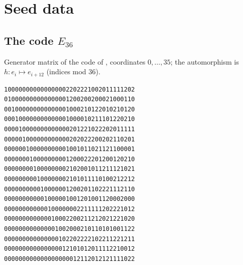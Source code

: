\documentclass[11pt]{amsart}
\theoremstyle{definition}
\begin{document}
\appendix

\section{Seed data}\label{app:seeds}

\subsection{The code \texorpdfstring{$E_{36}$}{E36}}\label{app:gjf}
Generator matrix of the code of \cite[Ex.~5.7(3)]{GJF}, coordinates $0,\dots,35$; the automorphism is
$h\colon e_i\mapsto e_{i+12}$ (indices mod $36$).
{\footnotesize
\begin{verbatim}
100000000000000002202221002011111202
010000000000000001200200200021000110
001000000000000001000210122010210120
000100000000000001000010211101220210
000010000000000000201221022202011111
000001000000000000202022200202110201
000000100000000001001011021121100001
000000010000000001200022201200120210
000000001000000002102001011211121021
000000000100000002101011110100212212
000000000010000001200201102221112110
000000000001000001001201001120002000
000000000000100000002211111202221012
000000000000010002200211212021221020
000000000000001002000210110101001122
000000000000000102202222102211221211
000000000000000012101012011112210012
000000000000000000012112012121111022
\end{verbatim}
}
\end{document}
